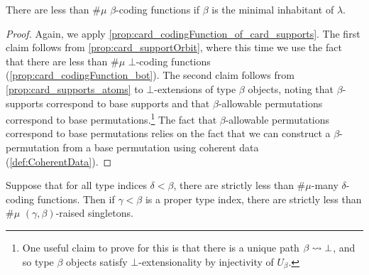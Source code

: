 \begin{proposition}
  \label{prop:card_codingFunction_min}
  There are less than \( \#\mu \) \( \beta \)-coding functions if \( \beta \) is the minimal inhabitant of \( \lambda \).
\end{proposition}
\begin{proof}
  Again, we apply \cref{prop:card_codingFunction_of_card_supports}.
  The first claim follows from \cref{prop:card_supportOrbit}, where this time we use the fact that there are less than \( \#\mu \) \( \bot \)-coding functions (\cref{prop:card_codingFunction_bot}).
  The second claim follows from \cref{prop:card_supports_atoms} to \( \bot \)-extensions of type \( \beta \) objects, noting that \( \beta \)-supports correspond to base supports and that \( \beta \)-allowable permutations correspond to base permutations.\footnote{One useful claim to prove for this is that there is a unique path \( \beta \rightsquigarrow \bot \), and so type \( \beta \) objects satisfy \( \bot \)-extensionality by injectivity of \( U_\beta \).}
  The fact that \( \beta \)-allowable permutations correspond to base permutations relies on the fact that we can construct a \( \beta \)-permutation from a base permutation using coherent data (\cref{def:CoherentData}).
\end{proof}
\begin{proposition}
  \label{prop:card_raisedSingleton}
  Suppose that for all type indices \( \delta < \beta \), there are strictly less than \( \#\mu \)-many \( \delta \)-coding functions.
  Then if \( \gamma < \beta \) is a proper type index, there are strictly less than \( \#\mu \) \( (\gamma,\beta) \)-raised singletons.
\end{proposition}
